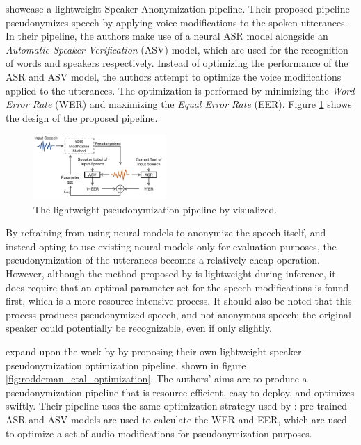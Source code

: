\documentclass[11pt]{article}
\begin{document}
\citet{kai2022lightweight} showcase a lightweight Speaker Anonymization pipeline.
Their proposed pipeline pseudonymizes speech by applying voice modifications to the spoken utterances.
In their pipeline, the authors make use of a neural ASR model alongside an \textit{Automatic Speaker Verification} (ASV) model, which are used for the recognition of words and speakers respectively.
Instead of optimizing the performance of the ASR and ASV model, the authors attempt to optimize the voice modifications applied to the utterances.
The optimization is performed by minimizing the \textit{Word Error Rate} (WER) and maximizing the \textit{Equal Error Rate} (EER).
Figure \ref{fig:kai_etal_pipeline} shows the design of the proposed pipeline.

\begin{figure}[h]
  \centering
  \includegraphics[width=0.45\textwidth]{kai_etal_pipeline.png}
  \caption{The lightweight pseudonymization pipeline by \citet{kai2022lightweight} visualized.}
  \label{fig:kai_etal_pipeline}
\end{figure}

By refraining from using neural models to anonymize the speech itself, and instead opting to use existing neural models only for evaluation purposes, the pseudonymization of the utterances becomes a relatively cheap operation.
However, although the method proposed by \citeauthor{kai2022lightweight} is lightweight during inference, it does require that an optimal parameter set for the speech modifications is found first, which is a more resource intensive process.
It should also be noted that this process produces pseudonymized speech, and not anonymous speech; the original speaker could potentially be recognizable, even if only slightly.

\citet{roddeman2024anonymization} expand upon the work by \citet{kai2022lightweight} by proposing their own lightweight speaker pseudonymization optimization pipeline, shown in figure \ref{fig:roddeman_etal_optimization}.
The authors' aims are to produce a pseudonymization pipeline that is resource efficient, easy to deploy, and optimizes swiftly.
Their pipeline uses the same optimization strategy used by \citeauthor{kai2022lightweight}: pre-trained ASR and ASV models are used to calculate the WER and EER, which are used to optimize a set of audio modifications for pseudonymization purposes.
\end{document}
